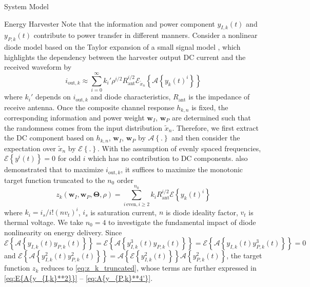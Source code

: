 \documentclass{IEEEtran}
\begin{document}
\begin{section} {System Model}
	\begin{subsection}	{Energy Harvester}
		Note that the information and power component $y_{I,k}(t)$ and $y_{P,k}(t)$ contribute to power transfer in different manners. Consider a nonlinear diode model based on the Taylor expansion of a small signal model \cite{Clerckx2018b,Clerckx2016a}, which highlights the dependency between the harvester output DC current and the received waveform by
		\begin{equation}	\label{eq:i_k}
			i_{\text{out},k}\approx\sum_{i=0}^{\infty}{k_i'}{\rho^{i/2}}{R_{\text{ant}}^{i/2}}\mathcal{E}_{\tilde{x}_n}\left\{{\mathcal{A}\left\{y_k(t)^i\right\}}\right\}
		\end{equation}
		where $k_i'$ depends on $i_{\text{out},k}$ and diode characteristics, $R_{\text{ant}}$ is the impedance of receive antenna. Once the composite channel response $h_{k,n}$ is fixed, the corresponding information and power weight $\boldsymbol{w}_I$, $\boldsymbol{w}_P$ are determined such that the randomness comes from the input distribution $\tilde{x}_n$. Therefore, we first extract the DC component based on $h_{k,n}$, $\boldsymbol{w}_I$, $\boldsymbol{w}_P$ by $\mathcal{A}\left\{.\right\}$ and then consider the expectation over $\tilde{x}_n$ by $\mathcal{E}\left\{.\right\}$. With the assumption of evenly spaced frequencies, $\mathcal{E}\left\{y^i(t)\right\}=0$ for odd $i$ which has no contribution to DC components. \cite{Clerckx2016a} also demonstrated that to maximize $i_{\text{out},k}$, it suffices to maximize the monotonic target function truncated to the $n_0$ order
		\begin{equation}	\label{eq:z_k}
			z_k(\boldsymbol{w}_I,\boldsymbol{w}_P,\boldsymbol{\Theta},\rho)=\sum_{i\,\text{even},i\ge2}^{n_0}{k_i}{R_{\text{ant}}^{i/2}}{\mathcal{E}\left\{y_k(t)^i\right\}}
		\end{equation}
		where $k_i=i_s/i!(nv_t)^i$, $i_s$ is saturation current, $n$ is diode ideality factor, $v_t$ is thermal voltage. We take $n_0=4$ to investigate the fundamental impact of diode nonlinearity on energy delivery. Since $\mathcal{E}\left\{\mathcal{A}\left\{y_{I,k}(t)y_{P,k}(t)\right\}\right\}=\mathcal{E}\left\{\mathcal{A}\left\{y_{I,k}^3(t)y_{P,k}(t)\right\}\right\}=\mathcal{E}\left\{\mathcal{A}\left\{y_{I,k}(t)y_{P,k}^3(t)\right\}\right\}=0$ and $\mathcal{E}\left\{\mathcal{A}\left\{y_{I,k}^2(t)y_{P,k}^2(t)\right\}\right\}=\mathcal{A}\left\{\mathcal{E}\left\{y_{I,k}^2(t)\right\}\right\}\mathcal{A}\left\{y_{P,k}^2(t)\right\}$, the target function $z_k$ reduces to \ref{eq:z_k_truncated}, whose terms are further expressed in \ref{eq:E{A{y_{I,k}**2}}} -- \ref{eq:A{y_{P,k}**4'}}.

\end{subsection}
\end{section}
\end{document}
